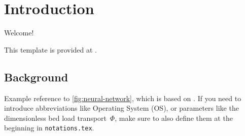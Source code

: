\chapter{Introduction}
\label{ch:introduction}

\setcounter{page}{1}

Welcome!

This template is provided at .

\section{Background}
\label{subsec:background}

Example reference to \autoref{fig:neural-network}, which is based on \cite{kim2017neural}. If you need to introduce abbreviations like Operating System (OS), or parameters like the dimensionless bed load transport~$\Phi$, make sure to also define them at the beginning in \texttt{notations.tex}.

